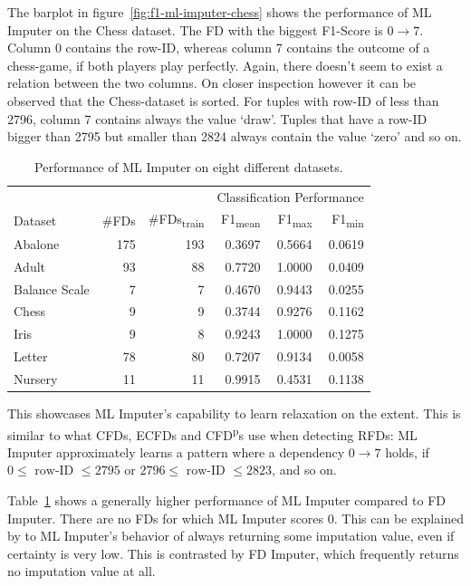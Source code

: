 The barplot in figure~\ref{fig:f1-ml-imputer-chess} shows the performance of ML Imputer on the Chess dataset.
The FD with the biggest F1-Score is \( 0 \rightarrow 7 \).
Column 0 contains the row-ID, whereas column 7 contains the outcome of a chess-game, if both players play perfectly.
Again, there doesn't seem to exist a relation between the two columns.
On closer inspection however it can be observed that the Chess-dataset is sorted.
For tuples with row-ID of less than 2796, column 7 contains always the value `draw'.
Tuples that have a row-ID bigger than 2795 but smaller than 2824 always contain the value `zero' and so on.

\begin{table}[ht]
    \centering
    \begin{tabular}{lrrrrr}
        \toprule
        & & & \multicolumn{3}{c}{Classification Performance} \\
        \cmidrule(lr{.25em}){4-6}
        Dataset & \#FDs & \#FDs\textsubscript{train} & F1\textsubscript{mean} & F1\textsubscript{max} & F1\textsubscript{min} \\
        \midrule
        Abalone & 175 & 193 & 0.3697 & 0.5664 & 0.0619 \\
        Adult & 93 & 88 & 0.7720 & 1.0000 & 0.0409 \\
        Balance Scale & 7 & 7 & 0.4670 & 0.9443 & 0.0255 \\
        Chess & 9 & 9 & 0.3744 & 0.9276 & 0.1162 \\
        Iris & 9 & 8 & 0.9243 & 1.0000 & 0.1275 \\
        Letter & 78 & 80 & 0.7207 & 0.9134 & 0.0058 \\
        Nursery & 11 & 11 & 0.9915 & 0.4531 & 0.1138 \\
        \bottomrule
    \end{tabular}
    \caption{Performance of ML Imputer on eight different datasets.}\label{tab:ml-imputer-performance}
\end{table}

This showcases ML Imputer's capability to learn relaxation on the extent.
This is similar to what CFDs, ECFDs and CFD\textsuperscript{p}s use when detecting RFDs:
ML Imputer approximately learns a pattern where a dependency \( 0 \rightarrow 7\) holds, if \( 0 \leq \text{ row-ID } \leq 2795 \) or \( 2796 \leq \text{ row-ID } \leq 2823 \), and so on.

Table~\ref{tab:ml-imputer-performance} shows a generally higher performance of ML Imputer compared to FD Imputer.
There are no FDs for which ML Imputer scores 0.
This can be explained by to ML Imputer's behavior of always returning some imputation value, even if certainty is very low.
This is contrasted by FD Imputer, which frequently returns no imputation value at all.

